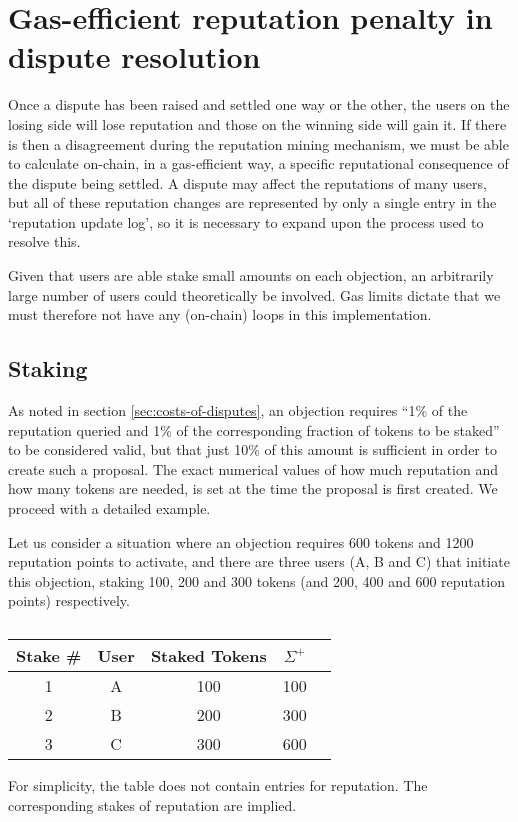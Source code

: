 \clearpage
\section{Gas-efficient reputation penalty in dispute resolution}\label{appendix:rep-transfer}

Once a dispute has been raised and settled one way or the other, the users on the losing side will lose reputation and those on the winning side will gain it. If there is then a disagreement during the reputation mining mechanism, we must be able to calculate on-chain, in a gas-efficient way, a specific reputational consequence of the dispute being settled. A dispute may affect the reputations of many users, but all of these reputation changes are represented by only a single entry in the `reputation update log', so it is necessary to expand upon the process used to resolve this.

Given that users are able stake small amounts on each objection, an arbitrarily large number of users could theoretically be involved. Gas limits dictate that we must therefore not have any (on-chain) loops in this implementation.

\subsection{Staking}

As noted in section \ref{sec:costs-of-disputes}, an objection requires ``1\% of the reputation queried and 1\% of the corresponding fraction of tokens to be staked'' to be considered valid, but that just 10\% of this amount is sufficient in order to create such a proposal. The exact numerical values of how much reputation and how many tokens are needed, is set at the time the proposal is first created. We proceed with a detailed example.

Let us consider a situation where an objection requires 600 tokens and 1200 reputation points to activate, and there are three users (A, B and C) that initiate this objection, staking 100, 200 and 300 tokens (and 200, 400 and 600 reputation points) respectively.  

\begin{table}[h]
\centering
\caption{}
\begin{tabular}{|c|c|c|c|c|}
\hline
Stake \# & User  & Staked Tokens & $\Sigma^+$ \\ \hline
1 & A & 100           & 100                                                                                          \\ \hline
2 & B & 200           & 300                                                                                           \\ \hline
3 & C & 300           & 600                                                                                           \\ \hline
\end{tabular}
\end{table}
For simplicity, the table does not contain entries for reputation. The corresponding stakes of reputation are implied.

